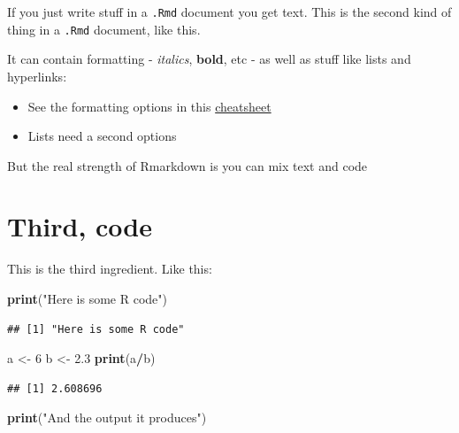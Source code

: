 \documentclass[]{book}
\newenvironment{Shaded}{\begin{snugshade}}{\end{snugshade}}
\newcommand{\KeywordTok}[1]{\textcolor[rgb]{0.13,0.29,0.53}{\textbf{#1}}}
\newcommand{\DecValTok}[1]{\textcolor[rgb]{0.00,0.00,0.81}{#1}}
\newcommand{\FloatTok}[1]{\textcolor[rgb]{0.00,0.00,0.81}{#1}}
\newcommand{\StringTok}[1]{\textcolor[rgb]{0.31,0.60,0.02}{#1}}
\newcommand{\OperatorTok}[1]{\textcolor[rgb]{0.81,0.36,0.00}{\textbf{#1}}}
\newcommand{\NormalTok}[1]{#1}
\providecommand{\tightlist}{%
  \setlength{\itemsep}{0pt}\setlength{\parskip}{0pt}}
\begin{document}
If you just write stuff in a \texttt{.Rmd} document you get text. This
is the second kind of thing in a \texttt{.Rmd} document, like this.

It can contain formatting - \emph{italics}, \textbf{bold}, etc - as well
as stuff like lists and hyperlinks:

\begin{itemize}
\tightlist
\item
  See the formatting options in this
  \href{https://github.com/rstudio/cheatsheets/raw/master/rmarkdown-2.0.pdf}{cheatsheet}
\item
  Lists need a second options
\end{itemize}

But the real strength of Rmarkdown is you can mix text and code

\section{Third, code}\label{third-code}

This is the third ingredient. Like this:

\begin{Shaded}
\begin{Highlighting}[]
\KeywordTok{print}\NormalTok{(}\StringTok{"Here is some R code"}\NormalTok{)}
\end{Highlighting}
\end{Shaded}

\begin{verbatim}
## [1] "Here is some R code"
\end{verbatim}

\begin{Shaded}
\begin{Highlighting}[]
\NormalTok{a <-}\StringTok{ }\DecValTok{6}
\NormalTok{b <-}\StringTok{ }\FloatTok{2.3}
\KeywordTok{print}\NormalTok{(a}\OperatorTok{/}\NormalTok{b)}
\end{Highlighting}
\end{Shaded}

\begin{verbatim}
## [1] 2.608696
\end{verbatim}

\begin{Shaded}
\begin{Highlighting}[]
\KeywordTok{print}\NormalTok{(}\StringTok{"And the output it produces"}\NormalTok{)}
\end{Highlighting}
\end{Shaded}
\end{document}
